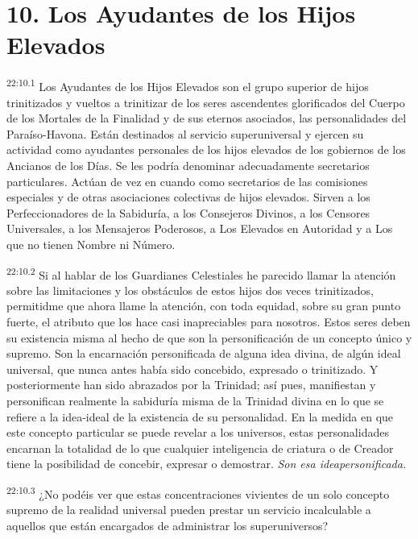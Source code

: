 \section*{10. Los Ayudantes de los Hijos Elevados}
\par
\textsuperscript{22:10.1} Los Ayudantes de los Hijos Elevados son el grupo superior de hijos trinitizados y vueltos a trinitizar de los seres ascendentes glorificados del Cuerpo de los Mortales de la Finalidad y de sus eternos asociados, las personalidades del Paraíso-Havona. Están destinados al servicio superuniversal y ejercen su actividad como ayudantes personales de los hijos elevados de los gobiernos de los Ancianos de los Días. Se les podría denominar adecuadamente secretarios particulares. Actúan de vez en cuando como secretarios de las comisiones especiales y de otras asociaciones colectivas de hijos elevados. Sirven a los Perfeccionadores de la Sabiduría, a los Consejeros Divinos, a los Censores Universales, a los Mensajeros Poderosos, a Los Elevados en Autoridad y a Los que no tienen Nombre ni Número.

\par
\textsuperscript{22:10.2} Si al hablar de los Guardianes Celestiales he parecido llamar la atención sobre las limitaciones y los obstáculos de estos hijos dos veces trinitizados, permitidme que ahora llame la atención, con toda equidad, sobre su gran punto fuerte, el atributo que los hace casi inapreciables para nosotros. Estos seres deben su existencia misma al hecho de que son la personificación de un concepto único y supremo. Son la encarnación personificada de alguna idea divina, de algún ideal universal, que nunca antes había sido concebido, expresado o trinitizado. Y posteriormente han sido abrazados por la Trinidad; así pues, manifiestan y personifican realmente la sabiduría misma de la Trinidad divina en lo que se refiere a la idea-ideal de la existencia de su personalidad. En la medida en que este concepto particular se puede revelar a los universos, estas personalidades encarnan la totalidad de lo que cualquier inteligencia de criatura o de Creador tiene la posibilidad de concebir, expresar o demostrar. \textit{Son esa ideapersonificada.}

\par
\textsuperscript{22:10.3} ¿No podéis ver que estas concentraciones vivientes de un solo concepto supremo de la realidad universal pueden prestar un servicio incalculable a aquellos que están encargados de administrar los superuniversos?

